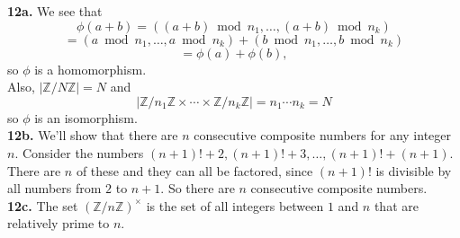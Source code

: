 \documentclass{article}
\newcommand{\Z}{\mathbb{Z}}
\begin{document}
\textbf{12a.} We see that
$$\phi(a + b) = ((a + b)\bmod{n_1}, \ldots, (a + b)\bmod{n_k})$$
$$= (a\bmod{n_1}, \ldots, a\bmod{n_k}) + (b\bmod{n_1}, \ldots, b\bmod{n_k})$$
$$= \phi(a) + \phi(b),$$
so $\phi$ is a homomorphism. \\

Also, $|\Z/N\Z| = N$ and
$$|\Z/n_1\Z \times \cdots \times \Z/n_k\Z| = n_1\cdots n_k = N$$
so $\phi$ is an isomorphism. \\

\textbf{12b.} We'll show that there are $n$ consecutive composite numbers for any integer $n$. Consider the numbers $(n + 1)! + 2, (n + 1)! + 3, \ldots, (n + 1)! + (n + 1)$. There are $n$ of these and they can all be factored, since $(n + 1)!$ is divisible by all numbers from $2$ to $n + 1$. So there are $n$ consecutive composite numbers. \\

\textbf{12c.} The set $(\Z/n\Z)^\times$ is the set of all integers between $1$ and $n$ that are relatively prime to $n$.
\end{document}
